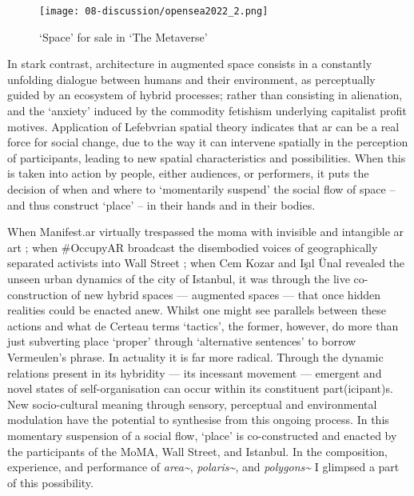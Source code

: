 \begin{figure}[ht]
    \centering
    \texttt{[image: 08-discussion/opensea2022\_2.png]}
    \captionsetup{justification=centering,margin=1.5cm}
    \caption{`Space' for sale in `The Metaverse' \citep[from][]{opensea2022}}\label{fig: opensea2022_2}
\end{figure}

In stark contrast, architecture in augmented space consists in a constantly unfolding dialogue between humans and their environment, as perceptually guided by an ecosystem of hybrid processes; rather than consisting in alienation, and the `anxiety' induced by the commodity fetishism underlying capitalist profit motives. Application of Lefebvrian spatial theory indicates that \gls{ar} can be a real force for social change, due to the way it can intervene spatially in the perception of participants, leading to new spatial characteristics and possibilities. When this is taken into action by people, either audiences, or performers, it puts the decision of when and where to `momentarily suspend' the social flow of space -- and thus construct `place' -- in their hands and in their bodies.

When Manifest.\gls{ar} virtually trespassed the \gls{moma} with invisible and intangible \gls{ar} art \citep{veenhof2010}; when \#OccupyAR broadcast the disembodied voices of geographically separated activists into Wall Street \citep{skwarek2018}; when Cem Kozar and Işıl Ünal \citeyearpar{thiel2011,thiel2018} revealed the unseen urban dynamics of the city of Istanbul, it was through the live co-construction of new hybrid spaces — augmented spaces — that once hidden realities could be enacted anew. Whilst one might see parallels between these actions and what de Certeau terms `tactics', the former, however, do more than just subverting place `proper' through `alternative sentences' to borrow Vermeulen's phrase. In actuality it is far more radical. Through the dynamic relations present in its hybridity — its incessant movement — emergent and novel states of self-organisation can occur within its constituent part(icipant)s. New socio-cultural meaning through sensory, perceptual and environmental modulation have the potential to synthesise from this ongoing process. In this momentary suspension of a social flow, `place' is co-constructed and enacted by the participants of the MoMA, Wall Street, and Istanbul. In the composition, experience, and performance of \textit{area\textasciitilde{}}, \textit{polaris\textasciitilde{}}, and \textit{polygons\textasciitilde{}} I glimpsed a part of this possibility.



